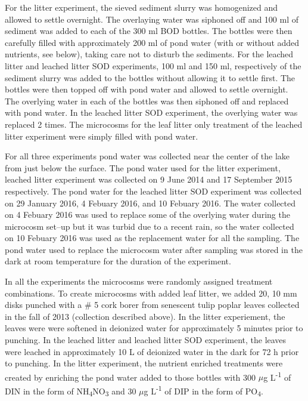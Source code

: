 For the litter experiment, the sieved sediment slurry was homogenized and allowed to settle overnight. The overlaying water was siphoned off and 100 ml of sediment was added to each of the 300 ml BOD bottles. The bottles were then carefully filled with approximately 200 ml of pond water (with or without added nutrients, see below), taking care not to disturb the sediments. For the leached litter and leached litter SOD experiments, 100 ml and 150 ml, respectively of the sediment slurry was added to the bottles without allowing it to settle first. The bottles were then topped off with pond water and allowed to settle overnight. The overlying water in each of the bottles was then siphoned off and replaced with pond water. In the leached litter SOD experiment, the overlying water was replaced 2 times. The microcosms for the leaf litter only treatment of the leached litter experiment were simply filled with pond water.

For all three experiments pond water was collected near the center of the lake from just below the surface.  The pond water used for the litter experiment, leached litter experiment was collected on 9 June 2014 and 17 September 2015 respectively. The pond water for the leached litter SOD experiment was collected on 29 January 2016, 4 Febuary 2016, and 10 Febuary 2016. The water collected on 4 Febuary 2016 was used to replace some of the overlying water during the microcosm set--up but it was turbid due to a recent rain, so the water collected on 10 Febuary 2016 was used as the replacement water for all the sampling. The pond water used to replace the microcosm water after sampling was stored in the dark at room temperature for the duration of the experiment.

In all the experiments the microcosms were randomly assigned treatment combinations. To create microcosms with added leaf litter, we added 20, 10 mm disks punched with a \# 5 cork borer from senescent tulip poplar leaves collected in the fall of 2013 (collection described above). In the litter experiement, the leaves were were softened in deionized water for approximately 5 minutes prior to punching. In the leached litter and leached litter SOD experiment, the leaves were leached in approximately 10 L of deionized water in the dark for 72 h prior to punching. In the litter experiment, the nutrient enriched treatments were created by enriching the pond water added to those bottles with 300 $\mu$g L\textsuperscript{-1} of DIN in the form of NH\textsubscript{4}NO\textsubscript{3} and 30 $\mu$g L\textsuperscript{-1} of DIP in the form of PO\textsubscript{4}.


